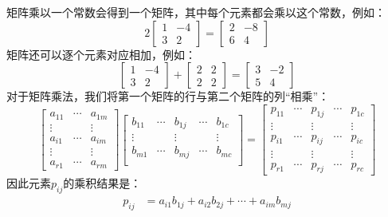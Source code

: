 \documentclass[lang=cn,12pt]{elegantbook}
\begin{document}
矩阵乘以一个常数会得到一个矩阵，其中每个元素都会乘以这个常数，例如：
$$
  2\left[\begin{array}{rr}
      1 & -4 \\
      3 & 2
    \end{array}\right]=\left[\begin{array}{rr}
      2 & -8 \\
      6 & 4
    \end{array}\right]
$$
矩阵还可以逐个元素对应相加，例如：
$$
  \left[\begin{array}{rr}
      1 & -4 \\
      3 & 2
    \end{array}\right]+\left[\begin{array}{ll}
      2 & 2 \\
      2 & 2
    \end{array}\right]=\left[\begin{array}{rr}
      3 & -2 \\
      5 & 4
    \end{array}\right]
$$
对于矩阵乘法，我们将第一个矩阵的行与第二个矩阵的列“相乘”：
$$
  \begin{bmatrix}
    a_{11} & \cdots & a_{1m} \\
    \vdots &        & \vdots \\
    a_{i1} & \cdots & a_{im} \\
    \vdots &        & \vdots \\
    a_{r1} & \cdots & a_{rm}
  \end{bmatrix}
  \begin{bmatrix}
    b_{11} & \cdots & b_{1j} & \cdots & b_{1c} \\
    \vdots &        & \vdots &        & \vdots \\
    b_{m1} & \cdots & b_{mj} & \cdots & b_{mc} \\
  \end{bmatrix}
  =
  \begin{bmatrix}
    p_{11} & \cdots & p_{1j} & \cdots & p_{1c} \\
    \vdots &        & \vdots &        & \vdots \\
    p_{i1} & \cdots & p_{ij} & \cdots & p_{ic} \\
    \vdots &        & \vdots &        & \vdots \\
    p_{r1} & \cdots & p_{rj} & \cdots & p_{rc}
  \end{bmatrix}
$$
因此元素$p_{ij}$的乘积结果是：
\begin{align}
  p_{ij} & = a_{i1}b_{1j} + a_{i2}b_{2j}+ \cdots + a_{im}b_{mj}
\end{align}
\end{document}
